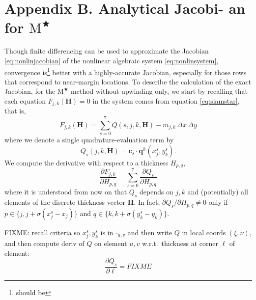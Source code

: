 \documentclass[twocolumn,letterpaper]{igs}
\newcommand\bc{\mathbf{c}}
\newcommand\bq{\mathbf{q}}
\newcommand\bH{\mathbf{H}}
\newcommand{\Mstar}{$\text{M}^{\bigstar}$\xspace}
\begin{document}
\begin{comment}
Here is what the MPAS Land-Ice User's Manual version 3.0 says:
\begin{quote}
\small
Velocities and fluxes are calculated on the midpoint of Voronoi cell edges.  The normal component of surface slope is calculated on cell edges using surface elevation at adjacent cell centers.  The tangential component of surface slope is calculated on cell edges using surface elevation at adjacent vertices. The surface elevation at vertices is calculated from the values at adjacent cell centers using barycentric interpolation. Ice thickness on edges is calculated as the average of the adjacent cell center values (2nd-order approximation).
\end{quote}
Looking at this, and their code, I don't think they think of it as Petrov-Galerkin
\end{comment}

\section{Appendix B. Analytical Jacobi- an for \Mstar}  \label{sec:appB}

Though finite differencing can be used to approximate the Jacobian \eqref{eq:nonlinjacobian} of the nonlinear algebraic system \eqref{eq:nonlinsystem}, convergence is\footnote{should be} better with a highly-accurate Jacobian, especially for those rows that correspond to near-margin locations.  To describe the calculation of the exact Jacobian, for the \Mstar method without upwinding only, we start by recalling that each equation $F_{j,k}(\bH)=0$ in the system comes from equation \eqref{eq:siamstar}, that is,
\begin{equation}
  F_{j,k}(\bH) = \sum_{s=0}^7 Q(s,j,k,\bH) - m_{j,k}\,\Delta x\,\Delta y\label{eq:jacfirst}
\end{equation}
where we denote a single quadrature-evaluation term by
\begin{equation}
Q_s(j,k,\bH) = \bc_s\cdot \bq^h(x_j^s,y_k^s). \label{eq:jacQterm}
\end{equation}
We compute the derivative with respect to a thickness $H_{p,q}$,
\begin{equation}
\frac{\partial F_{j,k}}{\partial H_{p,q}} = \sum_{s=0}^7 \frac{\partial Q_s}{\partial H_{p,q}} \label{eq:jacQsum}
\end{equation}
where it is understood from now on that $Q_s$ depends on $j,k$ and (potentially) all elements of the discrete thickness vector $\bH$.  In fact, $\partial Q_s/\partial H_{p,q} \ne 0$ only if $p \in \{j,j+\sigma(x_j^s-x_j)\}$ and $q \in \{k,k+\sigma(y_k^s-y_k)\}$.

FIXME: recall criteria so $x_j^s,y_k^s$ is in $\square_{u,v}$ and then write $Q$ in local coords $(\xi,\nu)$, and then compute deriv of $Q$ on element $u,v$ w.r.t.~thickness at corner $\ell$ of element:
\begin{equation}
\frac{\partial Q_s}{\partial \ell} = FIXME
\end{equation}
\end{document}
